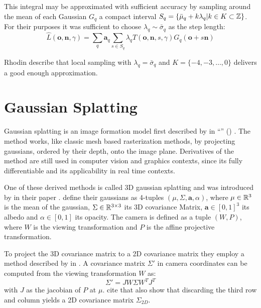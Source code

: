 \documentclass[a4paper, 11pt]{memoir}
\begin{document}
    This integral may be approximated with sufficient accuracy by sampling around the mean of each Gaussian $G_q$
    a compact interval $S_q = \{ \bar{\mu}_q + k\lambda_q | k \in K \subset \mathbb{Z} \}$. For their purposes it was sufficient
    to choose $\lambda_q \sim \bar{\sigma}_q$ as the step length:
    \begin{equation}
        \hat{L}(\mathbf{o}, \mathbf{n}, \gamma) = \sum_q \mathbf{a}_q \sum_{s \in S_q}
            \lambda_q T(\mathbf{o}, \mathbf{n}, s, \gamma)G_q(\mathbf{o} + s\mathbf{n})
        \label{eq:radiance}
    \end{equation}

    Rhodin \etal describe that local sampling with $\lambda_q = \bar{\sigma}_q$ and
    $K = \{ -4, -3, \dots, 0 \}$ delivers a good enough approximation.

    \section{Gaussian Splatting}
    Gaussian splatting is an image formation model first described by \citeauthor{splatting} in \enquote{}
    (\citeyear{splatting}) \cite{splatting}. The method works, like classic mesh based rasterization methods, by projecting
    gaussians, ordered by their depth, onto the image plane. Derivatives of the method are still used in computer vision and graphics
    contexts, since its fully differentiable and its applicability in real time contexts.

    One of these derived methods is called 3D gaussian splatting and was introduced by \citeauthor{kerbl3Dgaussians} in their
    \citeyear{kerbl3Dgaussians} paper \cite{kerbl3Dgaussians}. \citeauthor{splatting} define their gaussians
    as 4-tuples $(\mu, \Sigma, \mathbf{a}, \alpha)$, where $\mu \in \mathbb{R}^3$ is the mean of the gaussian, $\Sigma \in \mathbb{R}^{3\times 3}$
    its 3D covariance Matrix, $\mathbf{a} \in [0, 1]^3$ its albedo and $\alpha \in [0, 1]$ its opacity. The camera is defined as a tuple
    $(W, P)$, where $W$ is the viewing transformation and $P$ is the affine projective transformation.

    To project the 3D covariance matrix to a 2D covariance matrix they employ a method described by \citeauthor{volume_splatting}
    in \cite{volume_splatting}. A covariance matrix $\Sigma'$ in camera coordinates can be computed
    from the viewing transformation $W$ as:
    \begin{equation}
        \Sigma' = JW\Sigma W^TJ^T
    \end{equation}
    with $J$ as the jacobian of $P$ at $\mu$. \citeauthor{kerbl3Dgaussians} cite that \citeauthor{volume_splatting} also show that discarding the third row and column yields
    a 2D covariance matrix $\Sigma_{2D}$.
\end{document}
